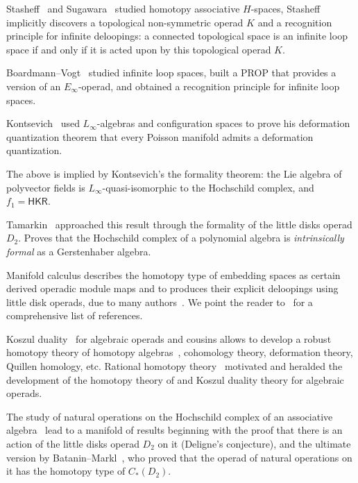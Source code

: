 \begin{tenumerate}
\item Stasheff~\cite{Stasheff1970,Stasheff1963,Stasheff1963a} and Sugawara~\cite{Sugawara55}
studied homotopy associative 
$H$-spaces, Stasheff implicitly discovers a topological
non-symmetric operad $K$ and a
recognition principle for infinite deloopings:
a connected topological space is an infinite
loop space if and only if it is acted upon
by this topological operad $K$. 

\item Boardmann--Vogt~\cite{Boardman1973,bams/1183530111} studied infinite loop spaces,
built a PROP that provides a version of an $E_\infty$-operad, 
and obtained a recognition principle for infinite loop spaces.

\item Kontsevich~\cite{Kontsevich2003} used $L_\infty$-algebras and
configuration spaces to prove his deformation
quantization theorem that every Poisson manifold
admits a deformation quantization.

\item The above is
implied by Kontsevich's the formality theorem: the
Lie algebra of polyvector fields is 
$L_\infty$-quasi-isomorphic to the Hochschild
complex, and $f_1 = \mathsf{HKR}$. 

\item Tamarkin~\cite{Tamarkin2003,Hinich2003} approached this result through 
the formality of the little disks operad $D_2$.
Proves that the Hochschild complex of a polynomial
algebra is \emph{intrinsically formal} as a 
Gerstenhaber algebra.

\item Manifold calculus describes the
homotopy type of embedding spaces as certain 
derived operadic module maps and to
produces their explicit deloopings
using little disk operads, due to 
many authors~\cite{Arone2007,Goodwillie1999,
Weiss1996,Weiss1999}. We point the reader
to~\cite{IdrissiPeccot} for a comprehensive
list of references.

\item Koszul duality~\cite{Ginzburg1994}
for algebraic 
operads and cousins allows to develop a robust 
homotopy theory of homotopy 
algebras~\cite{Vallette2020,Hinich1999}, cohomology
theory, deformation theory, Quillen homology, etc. Rational homotopy theory~\cite{Quillen1967,Felix2001,Sullivan1977}
motivated and heralded the development of the homotopy theory of and Koszul duality
theory for algebraic operads.

\item The study
of natural operations on the Hochschild complex
of an associative algebra~\cite{Hochschild1945} lead to a manifold of 
results beginning with the proof that there is
an action of the little disks operad $D_2$ on
it (Deligne's conjecture), and the ultimate version by Batanin--Markl~\cite{Batanin2014},
who proved that the operad of natural operations
on it has the homotopy type of $C_*(D_2)$.  
\end{tenumerate}


